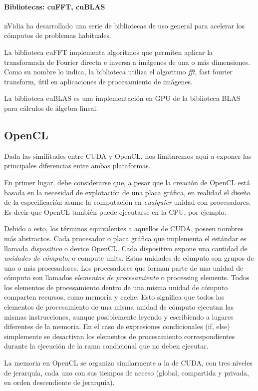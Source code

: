 \paragraph{Bibliotecas: cuFFT, cuBLAS}
nVidia ha desarrollado una serie de bibliotecas de uso general para acelerar los cómputos de problemas habituales.

La biblioteca cuFFT implementa algoritmos que permiten aplicar la transformada de Fourier directa e inversa a im\'agenes de una o m\'as dimensiones.
Como su nombre lo indica, la biblioteca utiliza el algoritmo {\em fft}, fast fourier transform, útil en aplicaciones de procesamiento de imágenes.

La biblioteca cuBLAS es una implementación en GPU de la biblioteca BLAS para cálculos de álgebra lineal.


\subsection{OpenCL}
Dada las similitudes entre CUDA y OpenCL, nos limitaremos aquí a exponer las principales diferencias entre ambas plataformas.

En primer lugar, debe considerarse que, a pesar que la creación de OpenCL está basada en la necesidad de explotación de una placa gráfica, en realidad el diseño de la especificación asume la computación en {\em cualquier} unidad con procesadores.
Es decir que OpenCL también puede ejecutarse en la CPU, por ejemplo.

Debido a esto, los términos equivalentes a aquellos de CUDA, poseen nombres más abstractos.
Cada procesador o placa gráfica que implementa el estándar es llamada {\em dispositivo} o device OpenCL. Cada dispositivo expone una cantidad de {\em unidades de cómputo}, o compute units. Estas unidades de cómputo son grupos de uno o más procesadores.
Los procesadores que forman parte de una unidad de cómputo son llamados {\em elementos
de procesamiento} o processing elements.
Todos los elementos de procesamiento dentro de una misma unidad de cómputo comparten recursos, como memoria y cache.
Esto significa que todos los elementos de procesamiento de una misma unidad de cómputo ejecutan las mismas instrucciones, aunque posiblemente leyendo y escribiendo a lugares diferentes de la memoria. En el caso de expresiones condicionales (if, else) simplemente se desactivan los elementos de procesamiento correspondientes durante la ejecución de la rama condicional que no deben ejecutar.

La memoria en OpenCL se organiza similarmente a la de CUDA, con tres niveles de jerarquía, cada uno con sus tiempos de acceso (global, compartida y privada, en orden descendiente de jerarquía).

